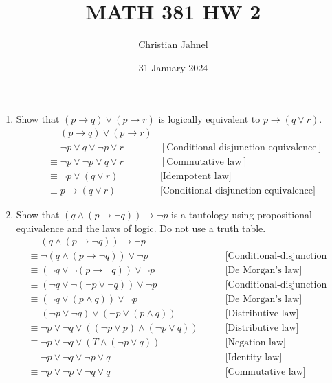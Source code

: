 \documentclass[letterpaper, 12pt]{article}
\title{MATH 381 HW 2}
\author{Christian Jahnel}
\date{31 January 2024}
\newcommand{\then}{\rightarrow}
\begin{document}
\maketitle
\begin{enumerate}
\item Show that $(p \then q) \vee (p \then r)$ is logically equivalent to $p \then (q \vee r)$.
\begin{align*}
    &\quad \; (p \then q) \vee (p \then r) \\
    &\equiv \neg p \vee q \vee \neg p \vee r \qquad
    &[\text{Conditional-disjunction equivalence}]\\
    &\equiv \neg p \vee \neg p \vee q \vee r \qquad
    &[\text{Commutative law}]\\
    &\equiv \neg p \vee (q \vee r) \qquad
    &\text{[Idempotent law]} \\
    &\equiv p \then (q \vee r) \qquad
    &\text{[Conditional-disjunction equivalence]}
\end{align*}
\item Show that $(q \wedge (p \then \neg q)) \then \neg p$ is a tautology using propositional
equivalence and the laws of logic. Do not use a truth table.
\begin{align*}
    &\quad \; (q \wedge (p \then \neg q)) \then \neg p \\
    &\equiv \neg (q \wedge (p \then \neg q)) \vee \neg p \qquad
    &\text{[Conditional-disjunction equivalence]} \\
    &\equiv (\neg q \vee \neg (p \then \neg q)) \vee \neg p \qquad
    &\text{[De Morgan's law]} \\
    &\equiv (\neg q \vee \neg (\neg p \vee \neg q)) \vee \neg p \qquad
    &\text{[Conditional-disjunction equivalence]} \\
    &\equiv (\neg q \vee (p \wedge q)) \vee \neg p \qquad
    &\text{[De Morgan's law]} \\
    &\equiv (\neg p \vee \neg q) \vee (\neg p \vee (p \wedge q)) \qquad
    &\text{[Distributive law]} \\
    &\equiv \neg p \vee \neg q \vee ((\neg p \vee p) \wedge (\neg p \vee q)) \qquad
    &\text{[Distributive law]} \\
    &\equiv \neg p \vee \neg q \vee (T \wedge (\neg p \vee q)) \qquad
    &\text{[Negation law]} \\
    &\equiv \neg p \vee \neg q \vee \neg p \vee q \qquad
    &\text{[Identity law]} \\
    &\equiv \neg p \vee \neg p \vee \neg q \vee q \qquad
    &\text{[Commutative law]} \\

\end{align*}
\end{enumerate}
\end{document}
